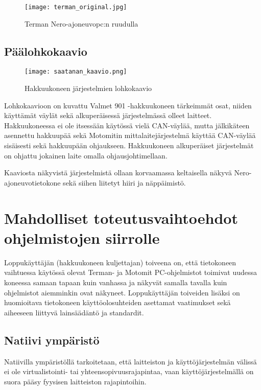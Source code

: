 \begin{figure}[H]
\centering
\texttt{[image: terman\_original.jpg]}
\caption{Terman Nero-ajoneuvopc:n ruudulla}
\end{figure}

\newpage
\section{Päälohkokaavio}

\begin{figure}[H]
\centering
\texttt{[image: saatanan\_kaavio.png]}
\caption{Hakkuukoneen järjestelmien lohkokaavio}
\end{figure}

Lohkokaavioon on kuvattu Valmet 901 -hakkuukoneen tärkeimmät osat, niiden käyttämät väylät sekä alkuperäisessä järjestelmässä olleet laitteet. Hakkuukoneessa ei ole itsessään käytössä vielä CAN-väylää, mutta jälkikäteen asennettu hakkuupää sekä Motomitin mittalaitejärjestelmä käyttää CAN-väylää sisäisesti sekä hakkuupään ohjaukseen. Hakkuukoneen alkuperäiset järjestelmät on ohjattu jokainen laite omalla ohjausjohtimellaan.


Kaaviosta näkyvistä järjestelmistä ollaan korvaamassa keltaisella näkyvä Nero-ajoneuvotietokone sekä siihen liitetyt hiiri ja näppäimistö.

\newpage
\chapter{Mahdolliset toteutusvaihtoehdot ohjelmistojen siirrolle}

Loppukäyttäjän (hakkuukoneen kuljettajan) toiveena on, että tietokoneen vaihtuessa käytössä olevat Terman- ja Motomit PC-ohjelmistot toimivat uudessa koneessa samaan tapaan kuin vanhassa ja näkyvät samalla tavalla kuin ohjelmistot aiemminkin ovat näkyneet. Loppukäyttäjän toiveiden lisäksi on huomioitava tietokoneen käyttöolosuhteiden asettamat vaatimukset sekä aiheeseen liittyvä lainsäädäntö ja standardit.

\section{Natiivi ympäristö}

Natiivilla ympäristöllä tarkoitetaan, että laitteiston ja käyttöjärjestelmän välissä ei ole virtualistointi- tai yhteensopivuusrajapintaa, vaan käyttöjärjestelmällä on suora pääsy fyysisen laitteiston rajapintoihin.

